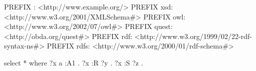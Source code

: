 PREFIX : <http://www.example.org/>
PREFIX xsd: <http://www.w3.org/2001/XMLSchema#>
PREFIX owl: <http://www.w3.org/2002/07/owl#>
PREFIX quest: <http://obda.org/quest#>
PREFIX rdf: <http://www.w3.org/1999/02/22-rdf-syntax-ns#>
PREFIX rdfs: <http://www.w3.org/2000/01/rdf-schema#>

select * where {
?x a  :A1 .
?x :R ?y .
  ?x :S ?z .
  }
